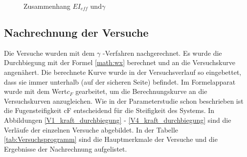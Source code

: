 \begin{figure}[h!]
\begin{center}
\caption{Zusammenhang $EI_{eff}$ und$\gamma$ }
\label{gamma1_EIeff}
\end{center}
\end{figure}

\subsection{Nachrechnung der Versuche}

Die Versuche wurden mit dem $\gamma$ -Verfahren nachgerechnet. Es wurde die Durchbiegung
mit der Formel \ref{math:wx} berechnet und an die Versuchskurve angenähert. Die berechnete
Kurve wurde in der Versuchsverlauf so eingebettet, dass sie immer unterhalb (auf
der sicheren Seite) befindet. Im Formelapparat wurde mit dem Wert$ c_{F}$ gearbeitet, um
die Berechnungskurve an die Versuchskurven anzugleichen. Wie in der Parameterstudie
schon beschrieben ist die Fugensteifigkeit cF entscheidend für die Steifigkeit des Systems.
In Abbildungen \ref{V1_kraft_durchbiegung} - \ref{V4_kraft_durchbiegung} sind die Verläufe der einzelnen Versuche abgebildet.
In der Tabelle \ref{tab:Versuchsprogramm} sind die Hauptmerkmale der Versuche und die Ergebnisse der Nachrechnung
aufgelistet.\\

